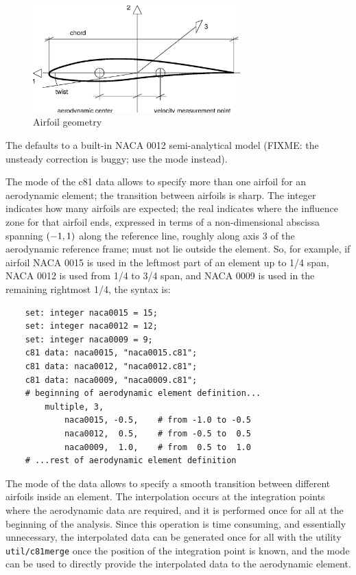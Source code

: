 \begin{figure}[h]
  \centering
    \includegraphics[width=80mm]{airfoil}
  \caption{Airfoil geometry}\label{fig:AIRFOIL}
\end{figure}

The  defaults to a built-in NACA 0012 semi-analytical
model (FIXME: the unsteady correction is buggy; use the 
mode instead).

The  mode of the c81 data allows to specify
more than one airfoil for an aerodynamic element; the transition
between airfoils is sharp.
The integer  indicates how many airfoils are expected;
the real  indicates where the influence zone for that
airfoil ends, expressed in terms of a non-dimensional abscissa spanning
$\left( -1,1 \right)$ along the reference line, roughly along axis 3
of the aerodynamic reference frame;  must not lie outside
the element.
So, for example, if airfoil NACA 0015 is used in the leftmost part
of an element up to 1/4 span, NACA 0012 is used from 1/4 to 3/4 span,
and NACA 0009 is used in the remaining rightmost 1/4, the syntax is:
\begin{verbatim}
    set: integer naca0015 = 15;
    set: integer naca0012 = 12;
    set: integer naca0009 = 9;
    c81 data: naca0015, "naca0015.c81";
    c81 data: naca0012, "naca0012.c81";
    c81 data: naca0009, "naca0009.c81";
    # beginning of aerodynamic element definition...
        multiple, 3,
            naca0015, -0.5,    # from -1.0 to -0.5
            naca0012,  0.5,    # from -0.5 to  0.5
            naca0009,  1.0,    # from  0.5 to  1.0
    # ...rest of aerodynamic element definition
\end{verbatim}

The  mode of the  data allows to specify
a smooth transition between different airfoils inside an element.
The interpolation occurs at the integration points where the
aerodynamic data are required, and it is performed once for all
at the beginning of the analysis.
Since this operation is time consuming, and essentially unnecessary,
the interpolated data can be generated once for all with the utility
\texttt{util/c81merge} once the position of the integration point is known,
and the  mode can be used to directly provide
the interpolated data to the aerodynamic element.

